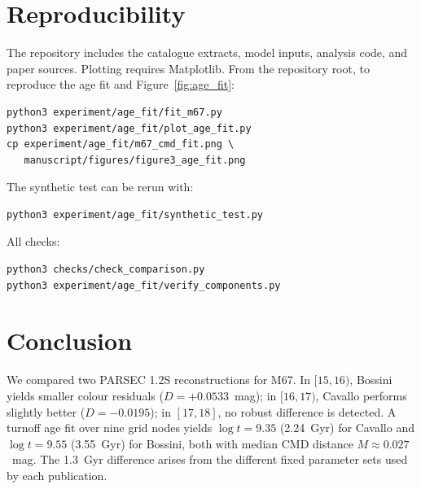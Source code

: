 \documentclass{article}
\begin{document}
\section{Reproducibility}
\label{sec:reproducibility}

The repository includes the catalogue extracts, model inputs, analysis code, and paper sources.
Plotting requires Matplotlib. From the repository root, to reproduce the age fit and Figure~\ref{fig:age_fit}:
\begin{verbatim}
python3 experiment/age_fit/fit_m67.py
python3 experiment/age_fit/plot_age_fit.py
cp experiment/age_fit/m67_cmd_fit.png \
   manuscript/figures/figure3_age_fit.png
\end{verbatim}
The synthetic test can be rerun with:
\begin{verbatim}
python3 experiment/age_fit/synthetic_test.py
\end{verbatim}
All checks:
\small
\begin{verbatim}
python3 checks/check_comparison.py
python3 experiment/age_fit/verify_components.py
\end{verbatim}

\section{Conclusion}
\label{sec:conclusion}

We compared two PARSEC 1.2S reconstructions for M67.
In $[15,16)$, Bossini yields smaller colour residuals
($D = +0.0533$~mag); in $[16,17)$, Cavallo performs
slightly better ($D = -0.0195$); in $[17,18]$, no robust
difference is detected.
A turnoff age fit over nine grid nodes yields $\log t = 9.35$
(2.24~Gyr) for Cavallo and $\log t = 9.55$ (3.55~Gyr) for
Bossini, both with median CMD distance $M \approx 0.027$~mag.
The 1.3~Gyr difference arises from the different fixed
parameter sets used by each publication.
\end{document}

